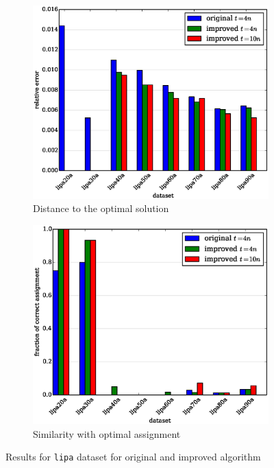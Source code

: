 \documentclass[english,a4paper,twoside]{ppfcmthesis}
\begin{document}
\begin{figure}
  \centering

  \begin{subfigure}{0.9\textwidth}
    \includegraphics[width=1.0\textwidth]{algorithm/metaheuristic/charts/complipaimproved/distance.eps}
    \caption{Distance to the optimal solution}
  \end{subfigure}
  \begin{subfigure}{0.9\textwidth}
    \includegraphics[width=1.0\textwidth]{algorithm/metaheuristic/charts/complipaimproved/similarity.eps}
    \caption{Similarity with optimal assignment}
  \end{subfigure}

  \caption{Results for \texttt{lipa} dataset for original and improved algorithm}
  \label{figure:am_lipa_results_improved}
\end{figure}
\end{document}
